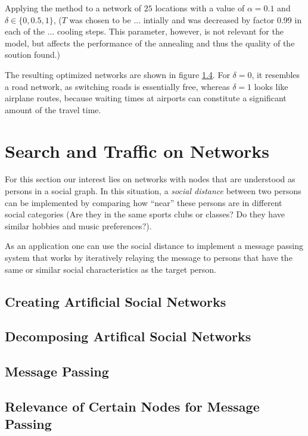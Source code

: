 \documentclass{scrartcl}
\begin{document}
Applying the method to a network of $25$ locations with a value of
$\alpha=0.1$ and $\delta \in \{0, 0.5, 1\}$, ($T$ was chosen to be ...
intially and was decreased by factor 0.99 in each of the ... cooling steps.
This parameter, however, is not relevant for the model, but affects the
performance of the annealing and thus the quality of the soution found.)

The resulting optimized networks are shown in figure \ref{}. For
$\delta=0$, it resembles a road network, as switching roads is essentially
free, whereas $\delta=1$ looks like airplane routes, because waiting times
at airports can constitute a significant amount of the travel time.



\clearpage 

\section{Search and Traffic on Networks}
For this section our interest lies on networks with nodes that are
understood as persons in a social graph. In this situation, a \emph{social
distance} between two persons can be implemented by comparing how
\enquote{near} these persons are in different social categories
(Are they in the same sports clubs or classes? Do they have similar hobbies
and music preferences?). 

As an application one can use the social distance
to implement a message passing system that works by iteratively relaying
the message to persons that have the same or similar social characteristics
as the target person.

\subsection{Creating Artificial Social Networks}
\subsection{Decomposing Artifical Social Networks}
\subsection{Message Passing}
\subsection{Relevance of Certain Nodes for Message Passing}
\end{document}
